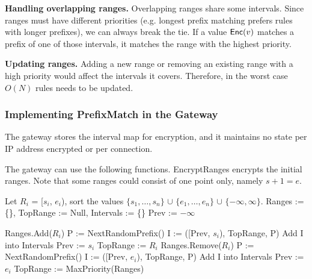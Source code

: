 \noindent \textbf{Handling overlapping ranges.} 
Overlapping ranges share some intervals. Since ranges must have different priorities (e.g. longest prefix matching prefers rules with longer prefixes), we can always break the tie. If a value $\mathsf{Enc}(v)$ matches a prefix of one of those intervals, it matches the range with the highest priority.

\noindent \textbf{Updating ranges.}
Adding a new range or removing an existing range with a high priority would affect the intervals it covers. Therefore, in the worst case $O(N)$ rules needs to be updated. 

\subsubsection{Implementing PrefixMatch in the Gateway}
\label{sec:tree}

The gateway stores the interval map for encryption, and it maintains no state per IP address encrypted or per connection.

The gateway can use the following functions. EncryptRanges encrypts the initial ranges. Note that some ranges could consist of
one point only, namely $s + 1 = e$. 


\begin{framed}
\begin{algorithmic}[1]

  \State Let $R_i$ = [$s_i$, $e_i$), sort the values 
              $\{s_1, \dots, s_n\}$ 
              $\cup$ $\{e_1, \dots, e_n\}$ 
              $\cup$ $\{-\infty, \infty\}$.
  \State Ranges := \{\}, 
  \State TopRange := Null, 
  \State Intervals := \{\}
  \State Prev := $-\infty$
    
      \State Ranges.Add($R_i$) 
        \State P := NextRandomPrefix()
        \State I := ([Prev, $s_i$), TopRange, P)
        \State Add I into Intervals
        \State Prev := $s_i$
        \State TopRange := $R_i$
      \EndIf
    \Else
      \State Ranges.Remove($R_i$) 
        \State P := NextRandomPrefix()
        \State I := ([Prev, $e_i$), TopRange, P)
        \State Add I into Intervals
        \State Prev := $e_i$
        \State TopRange := MaxPriority(Ranges)
      \EndIf
    \EndIf
  \EndFor
  \State {}
\EndProcedure

\end{algorithmic}
\end{framed}

